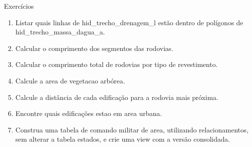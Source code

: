 \documentclass{beamer}
\begin{document}
\begin{frame}[fragile]{Exercícios}


\begin{enumerate}[mini template]
\item Listar quais linhas de hid\_trecho\_drenagem\_l estão dentro de polígonos de hid\_trecho\_massa\_dagua\_a.
\item Calcular o comprimento dos segmentos das rodovias.
\item Calcular o comprimento total de rodovias por tipo de revestimento.
\item Calcule a area de vegetacao arbórea.
\item Calcule a distância de cada edificação para a rodovia mais próxima.
\item Encontre quais edificações estao em area urbana.
\item Construa uma tabela de comando militar de area, utilizando relacionamentos, sem alterar a tabela estados, e crie uma view com a versão consolidada.
\end{enumerate}

\end{frame}
\end{document}
